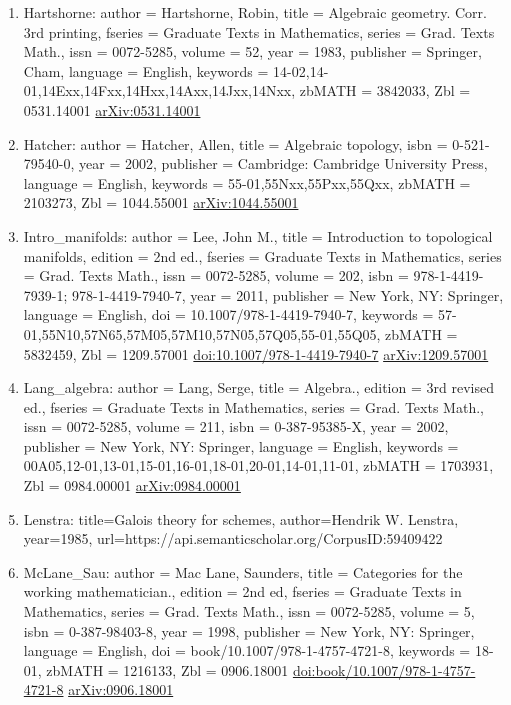 \documentclass[11pt]{article}
\begin{document}
\begin{enumerate}[leftmargin=*]
  \item Hartshorne: author = Hartshorne, Robin, title = Algebraic geometry. Corr. 3rd printing, fseries = Graduate Texts in Mathematics, series = Grad. Texts Math., issn = 0072-5285, volume = 52, year = 1983, publisher = Springer, Cham, language = English, keywords = 14-02,14-01,14Exx,14Fxx,14Hxx,14Axx,14Jxx,14Nxx, zbMATH = 3842033, Zbl = 0531.14001 \href{https://arxiv.org/abs/0531.14001}{arXiv:0531.14001}
  \item Hatcher: author = Hatcher, Allen, title = Algebraic topology, isbn = 0-521-79540-0, year = 2002, publisher = Cambridge: Cambridge University Press, language = English, keywords = 55-01,55Nxx,55Pxx,55Qxx, zbMATH = 2103273, Zbl = 1044.55001 \href{https://arxiv.org/abs/1044.55001}{arXiv:1044.55001}
  \item Intro\_manifolds: author = Lee, John M., title = Introduction to topological manifolds, edition = 2nd ed., fseries = Graduate Texts in Mathematics, series = Grad. Texts Math., issn = 0072-5285, volume = 202, isbn = 978-1-4419-7939-1; 978-1-4419-7940-7, year = 2011, publisher = New York, NY: Springer, language = English, doi = 10.1007/978-1-4419-7940-7, keywords = 57-01,55N10,57N65,57M05,57M10,57N05,57Q05,55-01,55Q05, zbMATH = 5832459, Zbl = 1209.57001 \href{https://doi.org/10.1007/978-1-4419-7940-7}{doi:10.1007/978-1-4419-7940-7} \href{https://arxiv.org/abs/1209.57001}{arXiv:1209.57001}
  \item Lang\_algebra: author = Lang, Serge, title = Algebra., edition = 3rd revised ed., fseries = Graduate Texts in Mathematics, series = Grad. Texts Math., issn = 0072-5285, volume = 211, isbn = 0-387-95385-X, year = 2002, publisher = New York, NY: Springer, language = English, keywords = 00A05,12-01,13-01,15-01,16-01,18-01,20-01,14-01,11-01, zbMATH = 1703931, Zbl = 0984.00001 \href{https://arxiv.org/abs/0984.00001}{arXiv:0984.00001}
  \item Lenstra: title=Galois theory for schemes, author=Hendrik W. Lenstra, year=1985, url=https://api.semanticscholar.org/CorpusID:59409422
  \item McLane\_Sau: author = Mac Lane, Saunders, title = Categories for the working mathematician., edition = 2nd ed, fseries = Graduate Texts in Mathematics, series = Grad. Texts Math., issn = 0072-5285, volume = 5, isbn = 0-387-98403-8, year = 1998, publisher = New York, NY: Springer, language = English, doi = book/10.1007/978-1-4757-4721-8, keywords = 18-01, zbMATH = 1216133, Zbl = 0906.18001 \href{https://doi.org/book/10.1007/978-1-4757-4721-8}{doi:book/10.1007/978-1-4757-4721-8} \href{https://arxiv.org/abs/0906.18001}{arXiv:0906.18001}

\end{enumerate}
\end{document}
